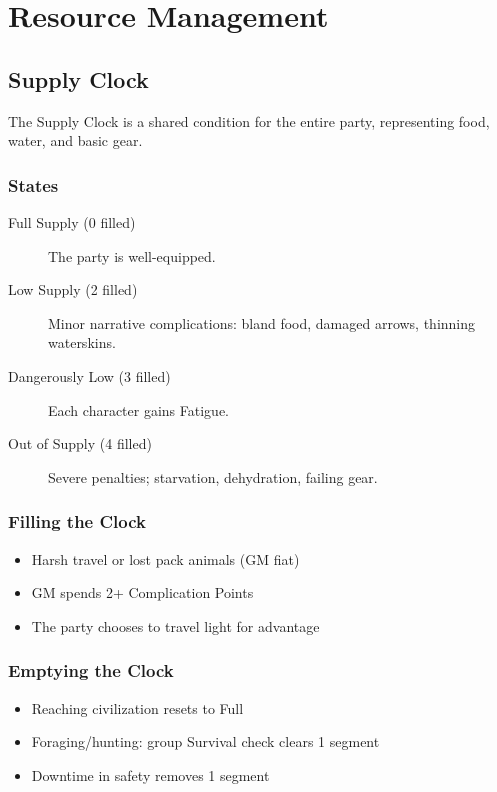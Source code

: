 \chapter{Resource Management}

\section{Supply Clock}

The Supply Clock is a shared condition for the entire party, representing food, water, and basic gear.

\subsection{States}

\begin{description}
\item[Full Supply (0 filled)] The party is well-equipped.
\item[Low Supply (2 filled)] Minor narrative complications: bland food, damaged arrows, thinning waterskins.
\item[Dangerously Low (3 filled)] Each character gains Fatigue.
\item[Out of Supply (4 filled)] Severe penalties; starvation, dehydration, failing gear.
\end{description}

\subsection{Filling the Clock}

\begin{itemize}
\item Harsh travel or lost pack animals (GM fiat)
\item GM spends 2+ Complication Points
\item The party chooses to travel light for advantage
\end{itemize}

\subsection{Emptying the Clock}

\begin{itemize}
\item Reaching civilization resets to Full
\item Foraging/hunting: group Survival check clears 1 segment
\item Downtime in safety removes 1 segment
\end{itemize}

